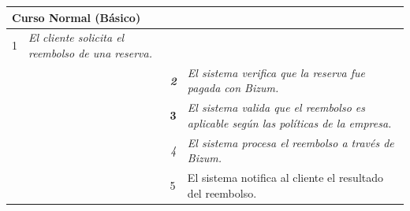 \begin{table}[H]
    \begin{tabular}{llllllll}
    \hline
    \multicolumn{8}{|l|}{\cellcolor[HTML]{F2F2F2}Curso Normal (Básico)}                                                                                                                                                                                                                                                                          \\ \hline
    \multicolumn{1}{|c|}{1}  & \multicolumn{1}{l|}{{\color[HTML]{808080} \textit{El cliente solicita el reembolso de una reserva.}}} & \multicolumn{1}{l|}{{\color[HTML]{808080} }}                    & \multicolumn{5}{l|}{{\color[HTML]{808080} }}                                                                                            \\ \hline
    \multicolumn{1}{|c|}{}   & \multicolumn{1}{l|}{{\color[HTML]{808080} \textit{}}}                                                 & \multicolumn{1}{c|}{{\color[HTML]{808080} \textit{\textbf{2}}}} & \multicolumn{5}{p{6cm}|}{{\color[HTML]{808080} \textit{El sistema verifica que la reserva fue pagada con Bizum.}}}                         \\ \hline
    \multicolumn{1}{|l|}{}   & \multicolumn{1}{l|}{{\color[HTML]{808080} }}                                                          & \multicolumn{1}{l|}{{\color[HTML]{808080} \textbf{3}}}          & \multicolumn{5}{p{6cm}|}{{\color[HTML]{808080} \textit{El sistema valida que el reembolso es aplicable según las políticas de la empresa.}}} \\ \hline
    \multicolumn{1}{|l|}{}   & \multicolumn{1}{l|}{{\color[HTML]{808080} }}                                                          & \multicolumn{1}{c|}{{\color[HTML]{808080} \textit{4}}}          & \multicolumn{5}{p{6cm}|}{{\color[HTML]{808080} \textit{El sistema procesa el reembolso a través de Bizum.}}}                   \\ \hline
    \multicolumn{1}{|l|}{}   & \multicolumn{1}{l|}{{\color[HTML]{808080} }}                                                          & \multicolumn{1}{l|}{{\color[HTML]{808080} 5}}                   & \multicolumn{5}{p{6cm}|}{{\color[HTML]{808080} El sistema notifica al cliente el resultado del reembolso.}}                                  \\ \hline
    \end{tabular}
    \end{table}

